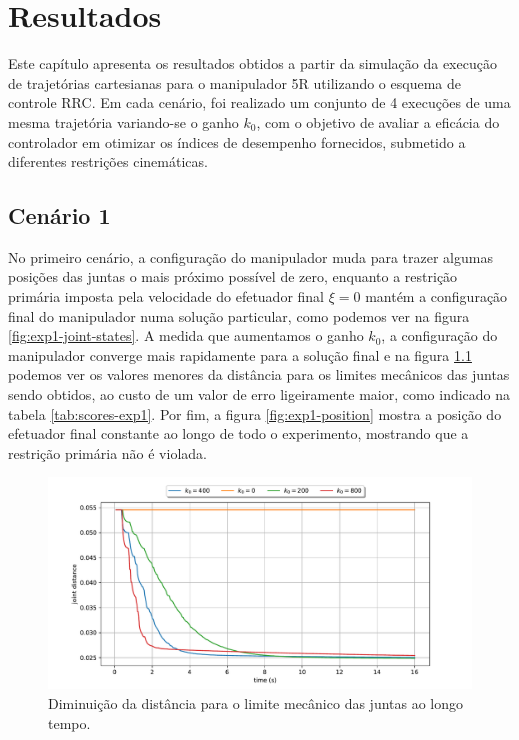 \chapter{Resultados}\label{cap:results}

Este capítulo apresenta os resultados obtidos a partir da simulação da 
execução de trajetórias cartesianas para o manipulador 5R utilizando o esquema 
de controle RRC. Em cada cenário, foi realizado um conjunto de 4 execuções de 
uma mesma trajetória variando-se o ganho \(k_0\), com o objetivo de avaliar 
a eficácia do controlador em otimizar os índices de desempenho fornecidos, submetido 
a diferentes restrições cinemáticas.

\section{Cenário 1}

No primeiro cenário, a configuração do manipulador muda para trazer algumas posições 
das juntas o mais próximo possível de zero, enquanto a restrição primária imposta pela velocidade 
do efetuador final \(\xi = 0\) mantém a configuração final do manipulador numa solução particular, 
como podemos ver na figura \ref*{fig:exp1-joint-states}. A medida que aumentamos o ganho \(k_0\), a 
configuração do manipulador converge mais rapidamente para a solução final e na figura \ref*{fig:exp1-metric} 
podemos ver os valores menores da distância para os limites mecânicos das juntas sendo obtidos, ao custo 
de um valor de erro ligeiramente maior, como indicado na tabela \ref*{tab:scores-exp1}. Por fim, a figura 
\ref*{fig:exp1-position} mostra a posição do efetuador final constante ao longo de todo o experimento, 
mostrando que a restrição primária não é violada.

\begin{figure}
	\centering
	\includegraphics[width=\textwidth]{./Images/2024-06-11-09-23-42/metric_joint_distance.pdf}
	\caption{Diminuição da distância para o limite mecânico das juntas ao longo tempo.}\label{fig:exp1-metric}
\end{figure}

